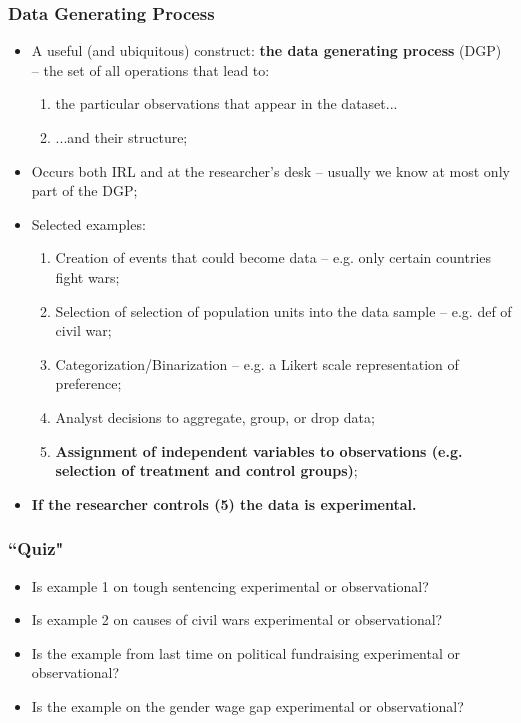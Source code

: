 \documentclass[aspectratio=169]{beamer}
\theoremstyle{principle}
\begin{document}
\begin{frame}
\frametitle{Data Generating Process}

\begin{itemize}
\item A useful (and ubiquitous) construct: \textbf{the data generating process} (DGP) -- the set of all operations that lead to:
\begin{enumerate}
\item the particular observations that appear in the dataset...
\item ...and their structure;
\end{enumerate}
\bigskip
\item Occurs both IRL and at the researcher's desk -- usually we know at most only part of the DGP;
\bigskip
\item Selected examples:
\begin{enumerate}
\item Creation of events that could become data -- e.g. only certain countries fight wars;
\item Selection of selection of population units into the data sample -- e.g. def of civil war;
\item Categorization/Binarization -- e.g. a Likert scale representation of preference;
\item Analyst decisions to aggregate, group, or drop data;
\item \textbf{Assignment of independent variables to observations (e.g. selection of treatment and control groups)};
\end{enumerate}
\bigskip
\item \textbf{If the researcher controls (5) the data is experimental.}
\end{itemize}

\end{frame}

\begin{frame}
\frametitle{``Quiz"}

\begin{itemize}
\item Is example 1 on tough sentencing experimental or observational?
\bigskip
\bigskip

\item Is example 2 on causes of civil wars experimental or observational?
\bigskip
\bigskip

\item Is the example from last time on political fundraising experimental or observational?
\bigskip
\bigskip

\item Is the example on the gender wage gap experimental or observational?
\end{itemize}

\end{frame}
\end{document}
